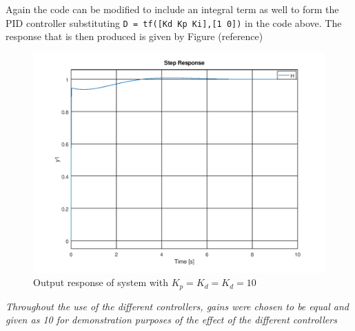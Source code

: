 \documentclass[a4paper, 12pt]{article}
\begin{document}
Again the code can be modified to include an integral term as well to form the PID controller substituting \texttt{D = tf([Kd Kp Ki],[1 0])} in the code above. The response that is then produced is given by Figure (reference)

\begin{figure}[H]
	\centering
	\includegraphics[width=\textwidth]{Images/question_4_output_response_PID.png}
	\caption{Output response of system with $K_p=K_d=K_d=10$}
	\label{fig:question_4_output_response_pid}
\end{figure}

\begin{center}
	\textit{Throughout the use of the different controllers, gains were chosen to be equal and given as 10 for demonstration purposes of the effect of the different controllers}
\end{center}

\end{document}
